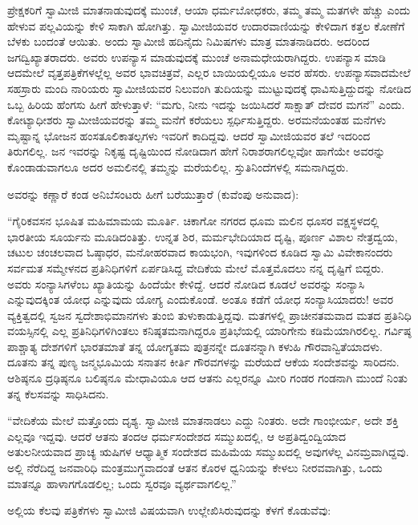 ಪ್ರೇಕ್ಷಕರಿಗೆ ಸ್ವಾಮೀಜಿ ಮಾತನಾಡುವುದಕ್ಕೆ ಮುಂಚೆ, ಆಯಾ ಧರ್ಮಬೋಧಕರು, ತಮ್ಮ ತಮ್ಮ ಮತಗಳೇ ಹೆಚ್ಚು ಎಂದು ಹೇಳುವ ಪಲ್ಲವಿಯನ್ನು ಕೇಳಿ ಸಾಕಾಗಿ ಹೋಗಿತ್ತು. ಸ್ವಾಮೀಜಿಯವರ ಉದಾರವಾಣಿಯನ್ನು ಕೇಳಿದಾಗ ಕತ್ತಲ ಕೋಣೆಗೆ ಬೆಳಕು ಬಂದಂತೆ ಆಯಿತು. ಅಂದು ಸ್ವಾಮೀಜಿ ಹದಿನೈದು ನಿಮಿಷಗಳು ಮಾತ್ರ ಮಾತನಾಡಿದರು. ಅದರಿಂದ ಜಗದ್ವಿಖ್ಯಾತರಾದರು. ಅವರು ಉಪನ್ಯಾಸ ಮಾಡುವುದಕ್ಕೆ ಮುಂಚೆ ಅನಾಮಧೇಯರಾಗಿದ್ದರು. ಉಪನ್ಯಾಸ ಮಾಡಿ ಆದಮೇಲೆ ವೃತ್ತಪತ್ರಿಕೆಗಳಲ್ಲೆಲ್ಲ ಅವರ ಭಾವಚಿತ್ರವೆ, ಎಲ್ಲರ ಬಾಯಿಯಲ್ಲಿಯೂ ಅವರ ಹೆಸರು. ಉಪನ್ಯಾಸವಾದಮೇಲೆ ಸಹಸ್ರಾರು ಮಂದಿ ನಾರಿಯರು ಸ್ವಾಮೀಜಿಯವರ ನಿಲುವಂಗಿ ತುದಿಯನ್ನು ಮುಟ್ಟುವುದಕ್ಕೆ ಧಾವಿಸುತ್ತಿದ್ದುದನ್ನು ನೋಡಿದ ಒಬ್ಬ ಹಿರಿಯ ಹೆಂಗಸು ಹೀಗೆ ಹೇಳುತ್ತಾಳೆ: “ಮಗು, ನೀನು ಇದನ್ನು ಜಯಿಸಿದರೆ ಸಾಕ್ಷಾತ್ ದೇವರ ಮಗನೆ” ಎಂದು. ಕೋಟ್ಯಾಧೀಶರು ಸ್ವಾಮೀಜಿಯವರನ್ನು ತಮ್ಮ ಮನೆಗೆ ಕರೆಯಲು ಸ್ಪರ್ಧಿಸುತ್ತಿದ್ದರು. ಅರಮನೆಯಂತಹ ಮನೆಗಳು ಮೃಷ್ಟಾನ್ನ ಭೋಜನ ಹಂಸತೂಲಿಕಾತಲ್ಪಗಳು ಇವರಿಗೆ ಕಾದಿದ್ದವು. ಆದರೆ ಸ್ವಾಮೀಜಿಯವರ ತಲೆ ಇದರಿಂದ ತಿರುಗಲಿಲ್ಲ. ಜನ ಇವರನ್ನು ನಿಕೃಷ್ಟ ದೃಷ್ಟಿಯಿಂದ ನೋಡಿದಾಗ ಹೇಗೆ ನಿರಾಶರಾಗಲಿಲ್ಲವೋ ಹಾಗೆಯೇ ಅವರನ್ನು ಕೊಂಡಾಡುವಾಗಲೂ ಅದರ ಅಮಲಿನಲ್ಲಿ ತಮ್ಮನ್ನು ಮರೆಯಲಿಲ್ಲ. ಸ್ತುತಿನಿಂದೆಗಳಲ್ಲಿ ಸಮನಾಗಿದ್ದರು. 

 ಅವರನ್ನು ಕಣ್ಣಾರೆ ಕಂಡ ಅನಿಬೆಸಂಟರು ಹೀಗೆ ಬರೆಯುತ್ತಾರೆ (ಕುವೆಂಪು ಅನುವಾದ): 

 “ಗೈರಿಕವಸನ ಭೂಷಿತ ಮಹಿಮಾಮಯ ಮೂರ್ತಿ. ಚಿಕಾಗೋ ನಗರದ ಧೂಮ ಮಲಿನ ಧೂಸರ ವಕ್ಷಸ್ಥಳದಲ್ಲಿ ಭಾರತೀಯ ಸೂರ್ಯನು ಮೂಡಿದಂತಿತ್ತು. ಉನ್ನತ ಶಿರ, ಮರ್ಮಭೇದಿಯಾದ ದೃಷ್ಟಿ, ಪೂರ್ಣ ವಿಶಾಲ ನೇತ್ರದ್ವಯ, ಚಟುಲ ಚಂಚಲವಾದ ಓಷ್ಠಾಧರ, ಮನೋಹರವಾದ ಕಾಯಭಂಗಿ, ಇವುಗಳಿಂದ ಕೂಡಿದ ಸ್ವಾಮಿ ವಿವೇಕಾನಂದರು ಸರ್ವಮತ ಸಮ್ಮೇಳನದ ಪ್ರತಿನಿಧಿಗಳಿಗೆ ಏರ್ಪಡಿಸಿದ್ದ ವೇದಿಕೆಯ ಮೇಲೆ ಮೊತ್ತಮೊದಲು ನನ್ನ ದೃಷ್ಟಿಗೆ ಬಿದ್ದರು. ಅವರು ಸಂನ್ಯಾಸಿಗಳೆಂಬ ಖ್ಯಾತಿಯನ್ನು ಹಿಂದೆಯೇ ಕೇಳಿದ್ದೆ. ಆದರೆ ನೋಡಿದ ಕೂಡಲೆ ಅವರನ್ನು ಸಂನ್ಯಾಸಿ ಎನ್ನುವುದಕ್ಕಿಂತ ಯೋಧ ಎನ್ನುವುದು ಯೋಗ್ಯ ಎಂದುಕೊಂಡೆ. ಅಂತೂ ಕಡೆಗೆ ಯೋಧ ಸಂನ್ಯಾಸಿಯಾದರು! ಅವರ ವ್ಯಕ್ತಿತ್ವದಲ್ಲಿ ಸ್ವಜನ ಸ್ವದೇಶಾಭಿಮಾನಗಳು ತುಂಬಿ ತುಳುಕಾಡುತ್ತಿದ್ದವು. ಮತಗಳಲ್ಲಿ ಪ್ರಾಚೀನತಮವಾದ ಮತದ ಪ್ರತಿನಿಧಿ ವಯಸ್ಸಿನಲ್ಲಿ ಎಲ್ಲ ಪ್ರತಿನಿಧಿಗಳಿಗಿಂತಲು ಕನಿಷ್ಠತಮನಾಗಿದ್ದರೂ ಪ್ರತಿಭೆಯಲ್ಲಿ ಯಾರಿಗೇನು ಕಡಿಮೆಯಾಗಿರಲಿಲ್ಲ. ಗರ್ವಿಷ್ಠ ಪಾಶ್ಚಾತ್ಯ ದೇಶಗಳಿಗೆ ಭಾರತಮಾತೆ ತನ್ನ ಯೋಗ್ಯತಮ ಪುತ್ರನನ್ನೇ ದೂತನನ್ನಾಗಿ ಕಳುಹಿ ಗೌರವಾನ್ವಿತೆಯಾದಳು. ದೂತನು ತನ್ನ ಪುಣ್ಯ ಜನ್ಮಭೂಮಿಯ ಸನಾತನ ಕೀರ್ತಿ ಗೌರವಗಳನ್ನು ಮರೆಯದೆ ಆಕೆಯ ಸಂದೇಶವನ್ನು ಸಾರಿದನು. ಆಶಿಷ್ಠನೂ ದ್ರಢಿಷ್ಠನೂ ಬಲಿಷ್ಠನೂ ಮೇಧಾವಿಯೂ ಆದ ಆತನು ಎಲ್ಲರನ್ನೂ ಮೀರಿ ಗಂಡರ ಗಂಡನಾಗಿ ಮುಂದೆ ನಿಂತು ತನ್ನ ಕೆಲಸವನ್ನು ಸಾಧಿಸಿದನು.

“ವೇದಿಕೆಯ ಮೇಲೆ ಮತ್ತೊಂದು ದೃಶ್ಯ. ಸ್ವಾಮೀಜಿ ಮಾತನಾಡಲು ಎದ್ದು ನಿಂತರು. ಅದೇ ಗಾಂಭೀರ್ಯ, ಅದೇ ಶಕ್ತಿ ಎಲ್ಲವೂ ಇದ್ದವು. ಆದರೆ ಆತನು ತಂದ\break ಆ ಧರ್ಮಸಂದೇಶದ ಸಮ್ಮುಖದಲ್ಲಿ, ಆ ಅಪ್ರತಿದ್ವಂದ್ವಿಯಾದ ಅತುಲನೀಯವಾದ ಪ್ರಾಚ್ಯ ಋಷಿಗಳ ಆಧ್ಯಾತ್ಮಿಕ ಸಂದೇಶದ ಮಹಿಮೆಯ ಸಮ್ಮುಖದಲ್ಲಿ ಅವುಗಳೆಲ್ಲ ವಿನಮ್ರವಾಗಿದ್ದವು. ಅಲ್ಲಿ ನೆರೆದಿದ್ದ ಜನವಾರಿಧಿ ಮಂತ್ರಮುಗ್ಧವಾದಂತೆ ಆತನ ಕೊರಳ ಧ್ವನಿಯನ್ನು ಕೇಳಲು ನೀರವವಾಗಿತ್ತು, ಒಂದು ಮಾತನ್ನೂ ಹಾಳಾಗಗೊಡಲಿಲ್ಲ; ಒಂದು ಸ್ವರವೂ ವ್ಯರ್ಥವಾಗಲಿಲ್ಲ.” 

 ಅಲ್ಲಿಯ ಕೆಲವು ಪತ್ರಿಕೆಗಳು ಸ್ವಾಮೀಜಿ ವಿಷಯವಾಗಿ ಉಲ್ಲೇಖಿಸಿರುವುದನ್ನು ಕೆಳಗೆ ಕೊಡುವೆವು: 

